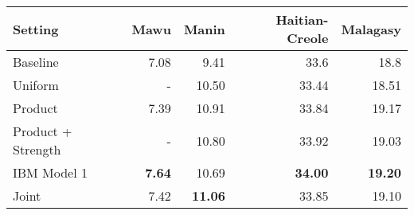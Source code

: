 \begin{tabular}{lrrrr}
\toprule
Setting & Mawu & Manin & Haitian-Creole & Malagasy \\
\toprule
Baseline & 7.08 & 9.41 & 33.6 & 18.8 \\
Uniform & - & 10.50 & 33.44 & 18.51 \\ 
\midrule
Product & 7.39 & 10.91 & 33.84 & 19.17 \\
Product + Strength & -  & 10.80 & 33.92 & 19.03 \\
IBM Model 1 & \textbf{7.64} & 10.69 & \textbf{34.00} & \textbf{19.20} \\
Joint & 7.42 & \textbf{11.06} & 33.85 & 19.10 \\
\bottomrule
\end{tabular}